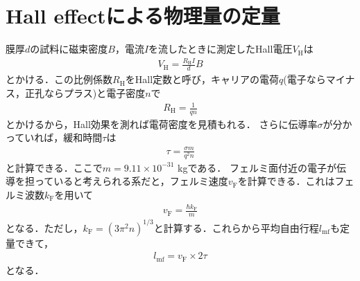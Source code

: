 \documentclass[11pt]{jbook}
\begin{document}
\chapter{Hall effectによる物理量の定量}
膜厚$d$の試料に磁束密度$B$，電流$I$を流したときに測定したHall電圧$V_\mathrm{H}$は
\begin{eqnarray}
	V_\mathrm{H} = \frac{R_\mathrm{H}I}{d}B
\end{eqnarray}
とかける．この比例係数$R_\mathrm{H}$をHall定数と呼び，キャリアの電荷$q$(電子ならマイナス，正孔ならプラス)と電子密度$n$で
\begin{eqnarray}
	R_\mathrm{H} = \frac{1}{qn}
\end{eqnarray}
とかけるから，Hall効果を測れば電荷密度を見積もれる．
さらに伝導率$\sigma$が分かっていれば，緩和時間$\tau$は
\begin{eqnarray}
	\tau = \frac{\sigma m }{q^2 n}
\end{eqnarray}
と計算できる．ここで$m = 9.11\times10^{-31}$ kgである．
フェルミ面付近の電子が伝導を担っていると考えられる系だと，フェルミ速度$v_\mathrm{F}$を計算できる．これはフェルミ波数$k_\mathrm{F}$を用いて
\begin{eqnarray}
	v_\mathrm{F} = \frac{\hbar k_\mathrm{F}}{m}
\end{eqnarray}
となる．ただし，$k_\mathrm{F} = (3\pi^2 n )^{1/3}$と計算する．これらから平均自由行程$l_\mathrm{mf}$も定量できて，
\begin{eqnarray}
	l_\mathrm{mf} = v_\mathrm{F}\times2\tau
\end{eqnarray}
となる．

\end{document}
